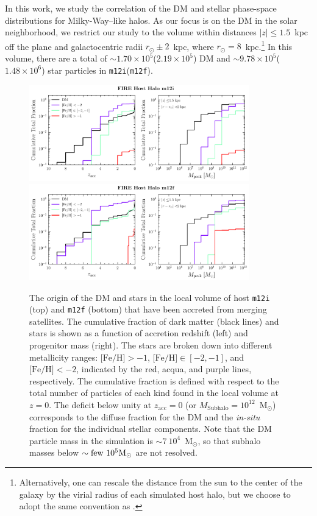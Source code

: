 \documentclass[twocolumn,preprintnumbers]{aastex6}
\newcommand{\FeH}{\text{[Fe/H]} }
\newcommand{\zacc}{z_\mathrm{acc}}
\newcommand{\mi}{\texttt{m12i}}
\newcommand{\mf}{\texttt{m12f}}
\begin{document}
In this work, we study the correlation of the DM and stellar phase-space distributions for Milky-Way--like halos.  As our focus is on the DM in the solar neighborhood, we restrict our study to the volume within distances $|z| \leq 1.5$~kpc off the plane and galactocentric radii $r_{\odot} \pm 2$~kpc, where $r_\odot = 8$~kpc.\footnote{Alternatively, one can rescale the distance from the sun to the center of the galaxy by the virial radius of each simulated host halo, but we choose to adopt the same convention as \cite{2018arXiv180610564S}.} In this volume, there are a total of $\sim 1.70\times 10^5$($2.19\times10^5$) DM and $\sim 9.78\times10^5$($1.48\times10^6$) star particles in \mi(\mf).  %

\begin{figure}[tb] %
   \centering
		\includegraphics[width=0.85\textwidth]{plots/particle_origins_cumulativem12i.pdf} 
		\includegraphics[width=0.85\textwidth]{plots/particle_origins_cumulativem12f.pdf} 
   \caption{The origin of the DM and stars in the local volume of host \texttt{m12i} (top) and \texttt{m12f} (bottom) that have been accreted from merging satellites.  The cumulative fraction of dark matter (black lines) and stars is shown as a function of accretion redshift (left) and progenitor mass (right).  The stars are broken down into different metallicity ranges: $\FeH > -1$, $\FeH \in [-2,-1]$, and $\FeH < -2$, indicated by the red, acqua, and purple lines, respectively.  The cumulative fraction is defined with respect to the total number of particles of each kind found in the local volume at $z=0$.  The deficit below unity at $\zacc = 0$ (or $M_\mathrm{Subhalo} = 10^{12}$~M$_\odot$) corresponds to the diffuse fraction for the DM and the \emph{in-situ} fraction for the individual stellar components.  Note that the DM particle mass in the simulation is $\sim 7~10^4$~M$_\odot$, so that subhalo masses below $\sim \rm{few} ~10^5 M_{\odot}$ are not resolved.}
   \label{fig:origins}
\end{figure}
 
\end{document}
